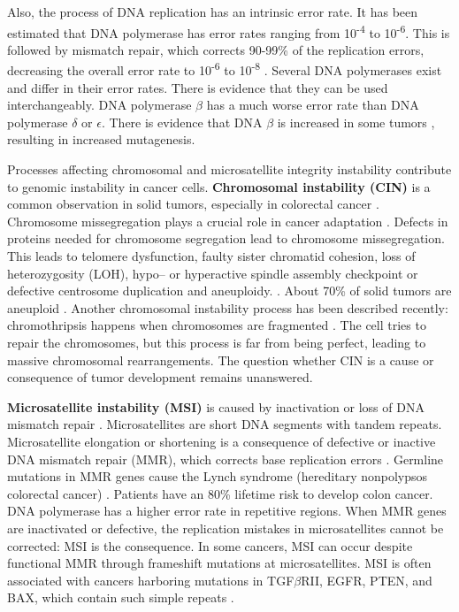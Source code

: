    Also, the process of DNA replication has an intrinsic error rate. It has
    been estimated that DNA polymerase has error rates ranging from
    10\textsuperscript{-4} to 10\textsuperscript{-6}. This is followed by
    mismatch repair, which corrects 90-99\% of the replication errors,
    decreasing the overall error rate to 10\textsuperscript{-6} to
    10\textsuperscript{-8} {\cite{multiple_mutations}}. Several DNA polymerases
    exist and differ in their error rates. There is evidence that they can be
    used interchangeably. DNA polymerase $\beta$ has a much worse error rate
    than DNA polymerase $\delta$ or $\epsilon$. There is evidence that DNA
    $\beta$ is increased in some tumors {\cite{dna_pol}}, resulting in increased
    mutagenesis.

    Processes affecting chromosomal and microsatellite integrity instability
    contribute to genomic instability in cancer cells. \textbf{Chromosomal
    instability (CIN)} is a common observation in solid tumors, especially in
    colorectal cancer {\cite{cin_crc}}. Chromosome missegregation plays a
    crucial role in cancer adaptation {\cite{chromosome_missegregation}}.
    Defects in proteins needed for chromosome segregation lead to chromosome
    missegregation. This leads to telomere dysfunction, faulty sister chromatid
    cohesion, loss of heterozygosity (LOH), hypo-- or hyperactive spindle
    assembly checkpoint or defective centrosome duplication and aneuploidy.
    {\cite{cin_crc}}. About 70\% of solid tumors are aneuploid
    {\cite{aneuploidy}}. Another chromosomal instability process has been
    described recently: chromothripsis happens when chromosomes are fragmented
    {\cite{chromothripsis_1}} {\cite{chromothripsis_2}}
    {\cite{chromothripsis_2}}. The cell tries to repair the chromosomes, but
    this process is far from being perfect, leading to massive chromosomal
    rearrangements. The question whether CIN is a cause or consequence of tumor
    development remains unanswered.

    \textbf{Microsatellite instability (MSI)} is caused by inactivation or loss
    of DNA mismatch repair {\cite{msi}}. Microsatellites are short DNA segments
    with tandem repeats. Microsatellite elongation or shortening is a
    consequence of defective or inactive DNA mismatch repair (MMR), which
    corrects base replication errors {\cite{cin_crc}}. Germline mutations in MMR
    genes cause the Lynch syndrome (hereditary nonpolypsos colorectal cancer)
    {\cite{lynch}}. Patients have an 80\% lifetime risk to develop colon cancer.
    DNA polymerase has a higher error rate in repetitive regions. When MMR genes
    are inactivated or defective, the replication mistakes in microsatellites
    cannot be corrected: MSI is the consequence. In some cancers, MSI can occur
    despite functional MMR through frameshift mutations at microsatellites. MSI
    is often associated with cancers harboring mutations in TGF$\beta$RII, EGFR,
    PTEN, and BAX, which contain such simple repeats {\cite{micro}}.


